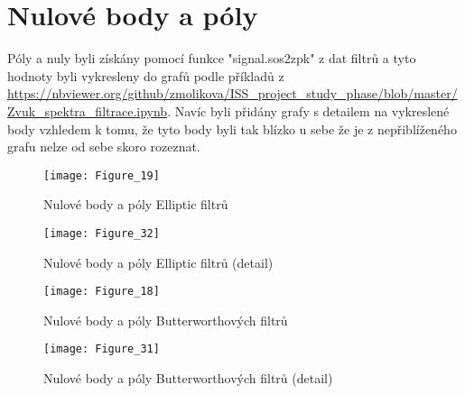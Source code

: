 \section{Nulové body a póly}
Póly a nuly byli získány pomocí funkce "signal.sos2zpk" z dat filtrů a tyto hodnoty byli vykresleny do grafů podle příkladů z \url{https://nbviewer.org/github/zmolikova/ISS_project_study_phase/blob/master/Zvuk_spektra_filtrace.ipynb}.
Navíc byli přidány grafy s detailem na vykreslené body vzhledem k tomu, že tyto body byli tak blízko u sebe že je z nepřiblíženého grafu nelze od sebe skoro rozeznat.

\begin{figure}[H] 
	\centering
	\texttt{[image: Figure\_19]}
	\caption{Nulové body a póly Elliptic filtrů}
\end{figure}

\begin{figure}[H] 
	\centering
	\texttt{[image: Figure\_32]}
	\caption{Nulové body a póly Elliptic filtrů (detail)}
\end{figure}

\begin{figure}[H] 
	\centering
	\texttt{[image: Figure\_18]}
	\caption{Nulové body a póly Butterworthových filtrů}
\end{figure}

\begin{figure}[H] 
	\centering
	\texttt{[image: Figure\_31]}
	\caption{Nulové body a póly Butterworthových filtrů (detail)}
\end{figure}